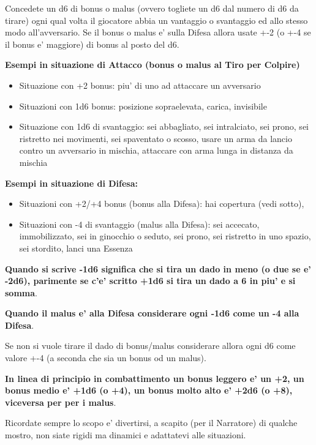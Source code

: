 \documentclass[a4paper,11pt,twoside,openany]{book}
\begin{document}
Concedete un d6 di bonus o malus (ovvero togliete un d6 dal numero di d6 da tirare) ogni qual volta il giocatore abbia un vantaggio o svantaggio ed allo stesso modo all'avversario. Se il bonus o malus e' sulla Difesa allora usate +-2 (o +-4 se il bonus e' maggiore) di bonus al posto del d6.

\bigskip

\textbf{Esempi in situazione di Attacco (bonus o malus al Tiro per Colpire)}

\begin{itemize}
	\item Situazione con +2 bonus: piu' di uno ad attaccare un avversario

	\item Situazioni con 1d6 bonus: posizione sopraelevata, carica, invisibile

	\item Situazione con 1d6 di svantaggio: sei abbagliato, sei intralciato, sei prono, sei ristretto nei movimenti, sei spaventato o scosso, usare un arma da lancio contro un avversario in mischia, attaccare con arma lunga in distanza da mischia
\end{itemize}

\textbf{Esempi in situazione di Difesa:}

\begin{itemize}
	\item Situazioni con +2/+4 bonus (bonus alla Difesa): hai copertura (vedi sotto),

	\item Situazioni con -4 di svantaggio (malus alla Difesa): sei accecato, immobilizzato, sei in ginocchio o seduto, sei prono, sei ristretto in uno spazio, sei stordito, lanci una Essenza 
\end{itemize}

\textbf{Quando si scrive -1d6 significa che si tira un dado in meno (o due se e' -2d6), parimente se c'e' scritto +1d6 si tira un dado a 6 in piu' e si somma}.

\textbf{Quando il malus e' alla Difesa considerare ogni -1d6 come un -4 alla Difesa}.

Se non si vuole tirare il dado di bonus/malus considerare allora ogni d6 come valore +-4 (a seconda che sia un bonus od un malus).

\textbf{In linea di principio in combattimento un bonus leggero e' un +2, un bonus medio e' +1d6 (o +4), un bonus molto alto e' +2d6 (o +8), viceversa per per i malus}.

\bigskip
Ricordate sempre lo scopo e' divertirsi, a scapito (per il Narratore) di qualche mostro, non siate rigidi ma dinamici e adattatevi alle situazioni.
\end{document}
